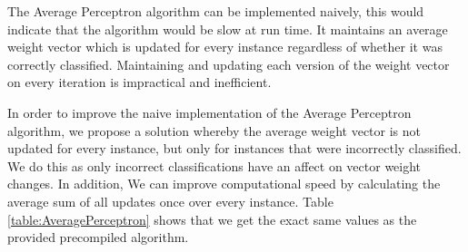 \documentclass{article} %
\begin{document}
The Average Perceptron algorithm can be implemented naively, this would indicate that the algorithm would be slow at run time. It maintains an average weight vector which is updated for every instance regardless of whether it was correctly classified. Maintaining and updating each version of the weight vector on every iteration is impractical and inefficient.

In order to improve the naive implementation of the Average Perceptron algorithm, we propose a solution whereby the average weight vector is not updated for every instance, but only for instances that were incorrectly classified. We do this as only incorrect classifications have an affect on vector weight changes. In addition, We can improve computational speed by calculating the average sum of all updates once over every instance. Table \ref{table:AveragePerceptron} shows that we get the exact same values as the provided precompiled algorithm.

\end{document}
